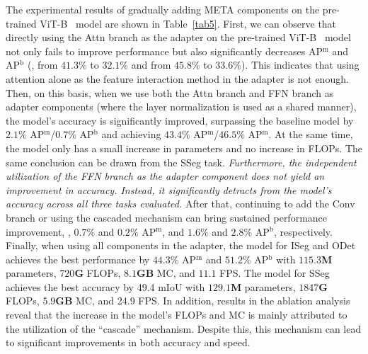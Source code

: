 
 The experimental results of gradually adding META components on the pre-trained ViT-B~\citep{li2022exploring} model are shown in Table~\ref{tab5}. First, we can observe that directly using the Attn branch as the adapter on the pre-trained ViT-B~\citep{li2022exploring} model not only fails to improve performance but also significantly decreases AP$^\textrm{m}$ and AP$^\textrm{b}$ (\ie, from $41.3\%$ to $32.1\%$ and from $45.8\%$ to $33.6\%$). This indicates that using attention alone as the feature interaction method in the adapter is not enough.
% 
Then, on this basis, when we use both the Attn branch and FFN branch as adapter components (where the layer normalization is used as a shared manner), the model's accuracy is significantly improved, surpassing the baseline model by $2.1\%$ AP$^\textrm{m}$/$0.7\%$ AP$^\textrm{b}$ and achieving $43.4\%$ AP$^\textrm{m}$/$46.5\%$ AP$^\textrm{m}$. 
At the same time, the model only has a small increase in parameters and no increase in FLOPs. The same conclusion can be drawn from the SSeg task.
\emph{Furthermore, the independent utilization of the FFN branch as the adapter component does not yield an improvement in accuracy. Instead, it significantly detracts from the model's accuracy across all three tasks evaluated.}
After that, continuing to add the Conv branch or using the cascaded mechanism can bring sustained performance improvement, \eg, $0.7\%$ and $0.2\%$ AP$^\textrm{m}$, and $1.6\%$ and $2.8\%$ AP$^\textrm{b}$, respectively. Finally, when using all components in the adapter, the model for ISeg and ODet achieves the best performance by $44.3\%$ AP$^\textrm{m}$ and $51.2\%$ AP$^\textrm{b}$ with $115.3$\textbf{M} parameters, $720$\textbf{G} FLOPs, $8.1$\textbf{GB} MC, and $11.1$ FPS. The model for SSeg achieves the best accuracy by 49.4 mIoU with $129.1$\textbf{M} parameters, $1847$\textbf{G} FLOPs, $5.9$\textbf{GB} MC, and 24.9 FPS.
% 
In addition, results in the ablation analysis reveal that the increase in the model's FLOPs and MC is mainly attributed to the utilization of the ``cascade'' mechanism. Despite this, this mechanism can lead to significant improvements in both accuracy and speed.
% 

